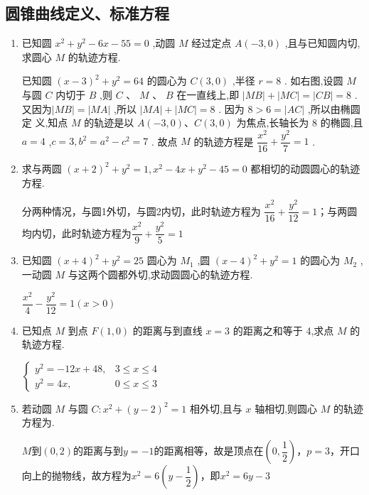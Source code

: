 \subsection*{圆锥曲线定义、标准方程}
\begin{enumerate}
    \item 已知圆 ${x}^{2} + {y}^{2} - {6x} - {55} = 0$ ,动圆 $M$ 经过定点 $A\left( {-3,0}\right)$ ,且与已知圆内切,求圆心 $M$ 的轨迹方程.
    \begin{jieda}
        已知圆 ${\left( x - 3\right) }^{2} + {y}^{2} = {64}$ 的圆心为 $C\left( {3,0}\right)$ ,半径 $r = 8$ . 如右图,设圆 $M$与圆 $C$ 内切于 $B$ ,则 $C$ 、 $M$ 、 $B$ 在一直线上,即 $\left| {MB}\right|  + \left| {MC}\right|  = \left| {CB}\right|  = 8$ . 又因为$\left| {MB}\right|  = \left| {MA}\right|$ ,所以 $\left| {MA}\right|  + \left| {MC}\right|  = 8$ . 因为 $8 > 6 = \left| {AC}\right|$ ,所以由椭圆定
        义,知点 $M$ 的轨迹是以 $A\left( {-3,0}\right) \text{、}C\left( {3,0}\right)$ 为焦点,长轴长为 8 的椭圆,且 $a = 4$ ,$c = 3,{b}^{2} = {a}^{2} - {c}^{2} = 7$ . 故点 $M$ 的轨迹方程是 $\dfrac{{x}^{2}}{16} + \dfrac{{y}^{2}}{7} = 1$ .
    \end{jieda}
    
    \item 求与两圆 ${\left( x + 2\right) }^{2} + {y}^{2} = 1,{x}^{2} - {4x} + {y}^{2} - {45} = 0$ 都相切的动圆圆心的轨迹方程.
    \begin{jieda}
        分两种情况，与圆1外切，与圆2内切，此时轨迹方程为
        $\dfrac{{x}^{2}}{16} + \dfrac{{y}^{2}}{12} = 1$；与两圆均内切，此时轨迹方程为$\dfrac{{x}^{2}}{9} + \dfrac{{y}^{2}}{5} = 1$
    \end{jieda}
    \item 已知圆 ${\left( x + 4\right) }^{2} + {y}^{2} = {25}$ 圆心为 ${M}_{1}$ ,圆 ${\left( x - 4\right) }^{2} + {y}^{2} = 1$ 的圆心为 ${M}_{2}$ ,一动圆 ${M}$ 与这两个圆都外切,求动圆圆心的轨迹方程.
    \begin{jieda}
        $\dfrac{{x}^{2}}{4} - \dfrac{{y}^{2}}{12} = 1\left( {x > 0}\right)$
    \end{jieda}
    
    \item 已知点 $M$ 到点 $F\left( {1,0}\right)$ 的距离与到直线 $x = 3$ 的距离之和等于 4,求点 $M$ 的轨迹方程.
    \begin{jieda}
        $\left\{  \begin{array}{ll} {y}^{2} =  - {12x} + {48}, & 3 \leq  x \leq  4 \\  {y}^{2} = {4x}, & 0 \leq  x \leq  3 \end{array}\right.$
    \end{jieda}
    \item 若动圆 $M$ 与圆 $C : {x}^{2} + {\left( y - 2\right) }^{2} = 1$ 相外切,且与 $x$ 轴相切,则圆心 $M$ 的轨迹方程为.
    \begin{jieda}
        $M$到$(0,2)$的距离与到$y = -1$的距离相等，故是顶点在$\left(0, \dfrac{1}{2}\right)$，$p = 3$，开口向上的抛物线，故方程为$x^2 = 6\left(y-\dfrac{1}{2}\right)$，即$x^2 = 6y - 3$


\end{jieda}
\end{enumerate}
